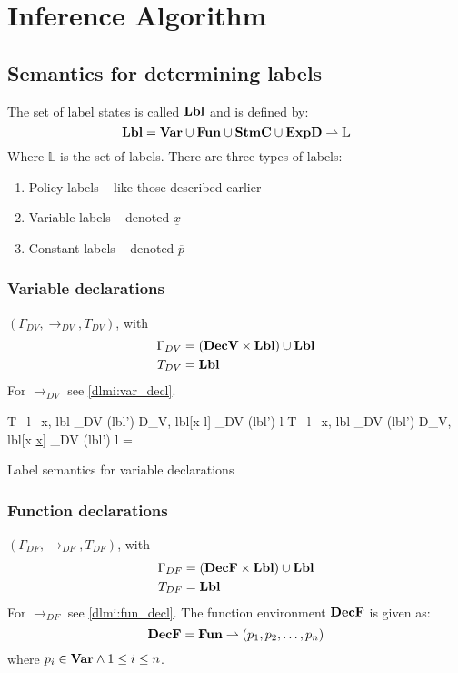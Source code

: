 
\section{Inference Algorithm}

\subsection{Semantics for determining labels}
The set of label states is called $\mathbf{Lbl}$ and is defined by:
\[
  \mathbf{Lbl} = \mathbf{Var} \cup \mathbf{Fun} \cup \mathbf{StmC} \cup \mathbf{ExpD} \rightharpoonup \mathbb{L}
\]
Where $\mathbb{L}$ is the set of labels.
There are three types of labels:
\begin{enumerate}
  \item Policy labels -- like those described earlier
  \item Variable labels -- denoted $\underline{x}$
  \item Constant labels -- denoted $\overline{p}$
\end{enumerate}

\subsubsection{Variable declarations}
$(\Gamma_{DV}, \rightarrow_{DV}, T_{DV})$, with
\begin{align*}
  \Gamma_{DV} & = (\mathbf{DecV} \times \mathbf{Lbl}) \cup \mathbf{Lbl} \\
  T_{DV} & = \mathbf{Lbl} \\
\end{align*}
For $\rightarrow_{DV}$ see \cref{dlmi:var_decl}.

\begin{table}
        {\langle T \, l \, x, lbl \rangle \rightarrow_{DV} (lbl')}
        {\langle D_V, lbl[x \mapsto l] \rangle \rightarrow_{DV} (lbl')}
        { l \in {}}
        {\langle T \, l \, x, lbl \rangle \rightarrow_{DV} (lbl')}
        {\langle D_V, lbl[x \mapsto \underline{x}] \rangle \rightarrow_{DV} (lbl')}
        { l = \epsilon}
\caption{Label semantics for variable declarations}
\label{dlmi:var_decl}
\end{table}

\subsubsection{Function declarations}
$(\Gamma_{DF}, \rightarrow_{DF}, T_{DF})$, with
\begin{align*}
  \Gamma_{DF} & = (\mathbf{DecF} \times \mathbf{Lbl}) \cup \mathbf{Lbl} \\
  T_{DF} & = \mathbf{Lbl}
\end{align*}
For $\rightarrow_{DF}$ see \cref{dlmi:fun_decl}.
The function environment $\mathbf{DecF}$ is given as:
\[ \mathbf{DecF} = \mathbf{Fun} \rightharpoonup (p_1, p_2, \dots, p_n) \]
where $p_i \in \mathbf{Var} \land 1 \leq i \leq n$.

